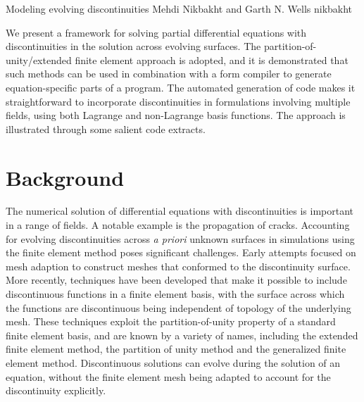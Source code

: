\newcommand{\vect}[1]{#1} %
\newcommand{\dif}{\, d}
\newcommand{\disc}[1]{\left\llbracket {#1} \right\rrbracket}
\newcommand{\pd}{\partial}

\newcommand{\eps}{\epsilon}

              {Modeling evolving discontinuities}
              {Mehdi Nikbakht and Garth N. Wells}
              {nikbakht}

We present a framework for solving partial differential equations
with discontinuities in the solution across evolving surfaces. The
partition-of-unity/extended finite element approach is adopted, and
it is demonstrated that such methods can be used in combination with
a form compiler to generate equation-specific parts of a program. The
automated generation of code makes it straightforward to incorporate
discontinuities in formulations involving multiple fields, using both
Lagrange and non-Lagrange basis functions.  The approach is illustrated
through some salient code extracts.

\section{Background}

The numerical solution of differential equations with discontinuities is
important in a range of fields. A notable example is the propagation of
cracks. Accounting for evolving discontinuities across \emph{a priori}
unknown surfaces in simulations using the finite element method poses
significant challenges.  Early attempts focused on mesh adaption to
construct meshes that conformed to the discontinuity surface.  More
recently, techniques have been developed that make it possible to include
discontinuous functions in a finite element basis, with the surface across
which the functions are discontinuous being independent of topology of
the underlying mesh. These techniques exploit the partition-of-unity
property of a standard finite element basis, and are known by a variety
of names, including the extended finite element method, the partition of unity method and the generalized finite element method.  Discontinuous solutions can evolve during the
solution of an equation, without the finite element mesh being adapted
to account for the discontinuity explicitly.

